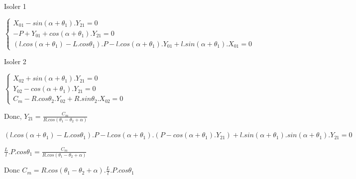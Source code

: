 Isoler 1

$\left\{\begin{array}{l}
X_{01}-sin(\alpha+\theta_1).Y_{21}=0 \\
-P+Y_{01}+cos(\alpha+\theta_1).Y_{21}=0 \\
(l.cos(\alpha+\theta_1)-L.cos\theta_1).P-l.cos(\alpha+\theta_1).Y_{01}+l.sin(\alpha+\theta_1).X_{01}=0
\end{array}\right.$

Isoler 2

$\left\{\begin{array}{l}
X_{02}+sin(\alpha+\theta_1).Y_{21}=0 \\
Y_{02}-cos(\alpha+\theta_1).Y_{21}=0 \\
C_m-R.cos\theta_2.Y_{02}+R.sin\theta_2.X_{02}=0
\end{array}\right.$

Donc, $Y_{21}=\frac{C_m}{R.cos(\theta_1-\theta_2+\alpha)}$

$(l.cos(\alpha+\theta_1)-L.cos\theta_1).P-l.cos(\alpha+\theta_1).(P-cos(\alpha+\theta_1).Y_{21})+l.sin(\alpha+\theta_1).sin(\alpha+\theta_1).Y_{21}=0$

$\frac{L}{l}.P.cos\theta_1=\frac{C_m}{R.cos(\theta_1-\theta_2+\alpha)}$

Donc $C_m=R.cos(\theta_1-\theta_2+\alpha).\frac{L}{l}.P.cos\theta_1$


